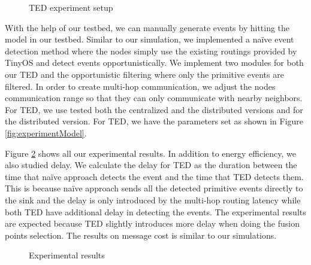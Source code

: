 \begin{figure}
\centering
{}
\caption{TED experiment setup}
\label{fig:experimentSetup}
\end{figure}

With the help of our testbed, we can manually generate events by hitting the model in our testbed. Similar to our simulation, we implemented a na\"{i}ve event detection method where the nodes simply use the existing routings provided by TinyOS \cite{nesc} and detect events opportunistically. We implement two modules for both our TED and the opportunistic filtering where only the primitive events are filtered. In order to create multi-hop communication, we adjust the nodes communication range so that they can only communicate with nearby neighbors. For TED, we use tested both the centralized and the distributed versions and for the distributed version. For TED, we have the parameters set as shown in Figure \ref{fig:experimentModel}.

Figure \ref{fig:exp-all} shows all our experimental results. In addition to energy efficiency, we also studied delay. We calculate the delay for TED as the duration between the time that na\"{i}ve approach detects the event and the time that TED detects them. This is because na\"{i}ve approach sends all the detected primitive events directly to the sink and the delay is only introduced by the multi-hop routing latency while both TED have additional delay in detecting the events. The experimental results are expected because TED slightly introduces more delay when doing the fusion points selection. The results on message cost is similar to our simulations.

\begin{figure}
\centering
{}
\caption{Experimental results}
\label{fig:exp-all}
\end{figure}
